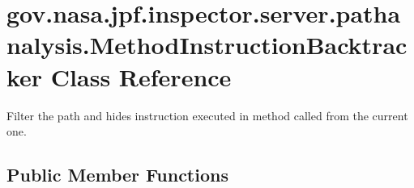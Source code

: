 \hypertarget{classgov_1_1nasa_1_1jpf_1_1inspector_1_1server_1_1pathanalysis_1_1_method_instruction_backtracker}{}\section{gov.\+nasa.\+jpf.\+inspector.\+server.\+pathanalysis.\+Method\+Instruction\+Backtracker Class Reference}
\label{classgov_1_1nasa_1_1jpf_1_1inspector_1_1server_1_1pathanalysis_1_1_method_instruction_backtracker}


Filter the path and hides instruction executed in method called from the current one.  


\subsection*{Public Member Functions}
